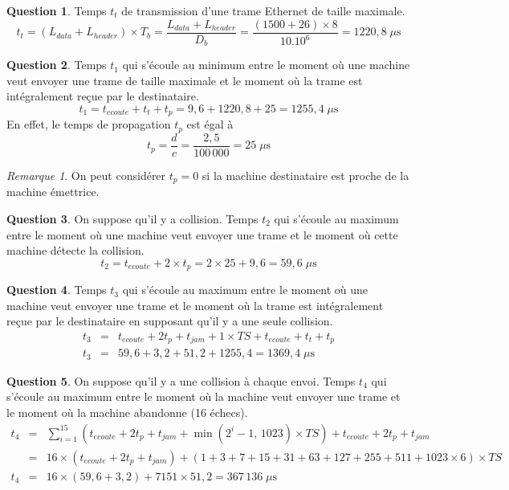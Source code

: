\documentclass[11pt,english,french]{scrreprt}
\theoremstyle{remark}
\newtheorem*{rem*}{Remarque}
\theoremstyle{definition}
\newtheorem{ques}{Question}[section]
\begin{document}
\begin{ques}
	Temps $t_t$ de transmission d'une trame Ethernet de taille maximale.
	\[t_t = (L_{data} + L_{header})\times T_b = \frac{L_{data} + L_{header}}{D_b} = \frac{(1500+26)\times 8}{10.10^6} = 1220,8\;\mu\textrm{s}\]
\end{ques}

\begin{ques}
	Temps $t_1$ qui s'écoule au minimum entre le moment où une machine veut envoyer une trame de taille maximale et le moment où la trame est intégralement reçue par le destinataire.
	\[t_1 = t_{ecoute} + t_t + t_p = 9,6 + 1220,8 + 25 = 1255,4\;\mu\textrm{s}\]
	En effet, le temps de propagation $t_p$ est égal à \[t_p = \frac{d}{c} = \frac{2,5}{100\,000} = 25\;\mu\textrm{s}\]
	\begin{rem*}
		On peut considérer $t_p = 0$ si la machine destinataire est proche de la machine émettrice.
	\end{rem*}
\end{ques}

\begin{ques}
	On suppose qu'il y a collision. Temps $t_2$ qui s'écoule au maximum entre le moment où une machine veut envoyer une trame et le moment où cette machine détecte la collision.
	\[t_2 = t_{ecoute} + 2\times t_p = 2\times 25 + 9,6 = 59,6\;\mu\textrm{s}\]
\end{ques}

\begin{ques}
	Temps $t_3$ qui s'écoule au maximum entre le moment où une machine veut envoyer une trame et le moment où la trame est intégralement reçue par le destinataire en supposant qu'il y a une seule collision.
	\begin{eqnarray*}
	t_{3} & = & t_{ecoute}+2t_{p}+t_{jam}+1\times TS+t_{ecoute}+t_{t}+t_{p}\\
	t_{3} & = & 59,6+3,2+51,2+1255,4=1369,4\;\mu\textrm{s}\end{eqnarray*}
\end{ques}

\begin{ques}
	On suppose qu'il y a une collision à chaque envoi. Temps $t_4$ qui s'écoule au maximum entre le moment où la machine veut envoyer une trame et le moment où la machine abandonne (16 échecs).
	\begin{eqnarray*}
	t_{4} & = & \sum_{i=1}^{15}\left(t_{ecoute}+2t_{p}+t_{jam}+\min\left(2^{i}-1,\,1023\right)\times TS\right)+t_{ecoute}+2t_{p}+t_{jam}\\
	 & = & 16\times\left(t_{ecoute}+2t_{p}+t_{jam}\right)+\left(1+3+7+15+31+63+127+255+511+1023\times6\right)\times TS\\
	t_{4} & = & 16\times\left(59,6+3,2\right)+7151\times51,2=367\,136\;\mu\textrm{s}\end{eqnarray*}
\end{ques}
\end{document}
